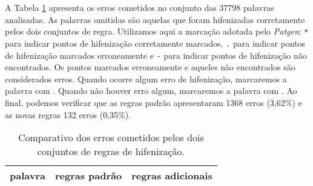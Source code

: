 \documentclass{article}
\newcommand{\cmark}{\ding{51}}%
\newcommand{\xmark}{\ding{55}}%
\begin{document}
A Tabela \ref{tab-resultados} apresenta os erros cometidos no conjunto das
37798 palavras analisadas. As palavras omitidas são aquelas que foram
hifenizadas corretamente pelos dois conjuntos de regra. Utilizamos aqui a
marcação adotada pelo \emph{Patgen}: \texttt{*} para indicar pontos de
hifenização corretamente marcados, \texttt{.} para indicar pontos de hifenização
marcados erroneamente e \texttt{-} para indicar pontos de hifenização não
encontrados. Os pontos marcados erroneamente e aqueles não encontrados são
considerados erros. Quando ocorre algum erro de hifenização, marcaremos a
palavra com \xmark. Quando não houver erro algum, marcaremos a palavra com
\cmark. Ao final, podemos verificar que as regras padrão apresentaram 1368 erros
(3,62\%) e as novas regras 132 erros (0,35\%).

\begin{longtable}{l l l}
\caption{Comparativo dos erros cometidos pelos dois conjuntos de regras de
hifenização.}\label{tab-resultados}\\
    \hline
    palavra & regras padrão & regras adicionais \\
    \hline
    \endhead
    
\end{longtable}


\printbibliography
\end{document}
